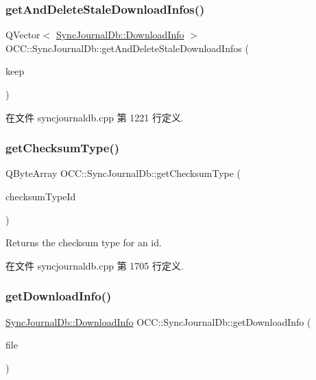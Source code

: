\subsubsection{\texorpdfstring{get\+And\+Delete\+Stale\+Download\+Infos()}{getAndDeleteStaleDownloadInfos()}}
{\footnotesize\ttfamily Q\+Vector$<$ \hyperlink{struct_o_c_c_1_1_sync_journal_db_1_1_download_info}{Sync\+Journal\+Db\+::\+Download\+Info} $>$ O\+C\+C\+::\+Sync\+Journal\+Db\+::get\+And\+Delete\+Stale\+Download\+Infos (\begin{DoxyParamCaption}\item[{const Q\+Set$<$ Q\+String $>$ \&}]{keep }\end{DoxyParamCaption})}



在文件 syncjournaldb.\+cpp 第 1221 行定义.

\mbox{\label{class_o_c_c_1_1_sync_journal_db_ac8137d253a83ed1da2668ea5304bfc6b}} 
\subsubsection{\texorpdfstring{get\+Checksum\+Type()}{getChecksumType()}}
{\footnotesize\ttfamily Q\+Byte\+Array O\+C\+C\+::\+Sync\+Journal\+Db\+::get\+Checksum\+Type (\begin{DoxyParamCaption}\item[{int}]{checksum\+Type\+Id }\end{DoxyParamCaption})}

Returns the checksum type for an id. 

在文件 syncjournaldb.\+cpp 第 1705 行定义.

\mbox{\label{class_o_c_c_1_1_sync_journal_db_aa90392931d3abcb21044a64edaa412f8}} 
\subsubsection{\texorpdfstring{get\+Download\+Info()}{getDownloadInfo()}}
{\footnotesize\ttfamily \hyperlink{struct_o_c_c_1_1_sync_journal_db_1_1_download_info}{Sync\+Journal\+Db\+::\+Download\+Info} O\+C\+C\+::\+Sync\+Journal\+Db\+::get\+Download\+Info (\begin{DoxyParamCaption}\item[{const Q\+String \&}]{file }\end{DoxyParamCaption})}




